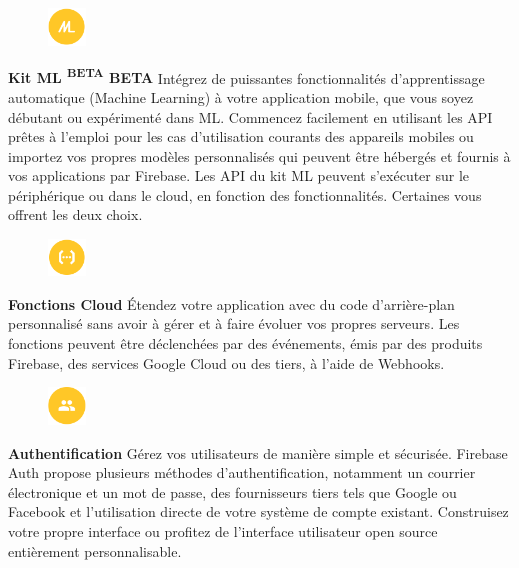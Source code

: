 \begin{figure}
	\includegraphics[width=1cm]{Images/chapter2/firebase_services/mlkit.png}
\end{figure}
\textbf{Kit ML \textsuperscript{BETA} \acrshort{BETA}} Intégrez de puissantes fonctionnalités d'apprentissage automatique (Machine Learning) à votre application mobile, que vous soyez débutant ou expérimenté dans \acrshort{ML}. Commencez facilement en utilisant les API prêtes à l'emploi pour les cas d'utilisation courants des appareils mobiles ou importez vos propres modèles personnalisés qui peuvent être hébergés et fournis à vos applications par Firebase. Les API du kit ML peuvent s'exécuter sur le périphérique ou dans le cloud, en fonction des fonctionnalités. Certaines vous offrent les deux choix.\medskip\\

\begin{figure}
	\includegraphics[width=1cm]{Images/chapter2/firebase_services/cloud_function.png}
\end{figure}
\textbf{Fonctions Cloud} Étendez votre application avec du code d’arrière-plan personnalisé sans avoir à gérer et à faire évoluer vos propres serveurs. Les fonctions peuvent être déclenchées par des événements, émis par des produits Firebase, des services Google Cloud ou des tiers, à l'aide de \gls{Webhook}s.\medskip

\begin{figure}
	\includegraphics[width=1cm]{Images/chapter2/firebase_services/authentication.png}
\end{figure}
\textbf{Authentification} Gérez vos utilisateurs de manière simple et sécurisée. Firebase Auth propose plusieurs méthodes d’authentification, notamment un courrier électronique et un mot de passe, des fournisseurs tiers tels que Google ou Facebook et l’utilisation directe de votre système de compte existant. Construisez votre propre interface ou profitez de l'interface utilisateur open source entièrement personnalisable.\medskip

